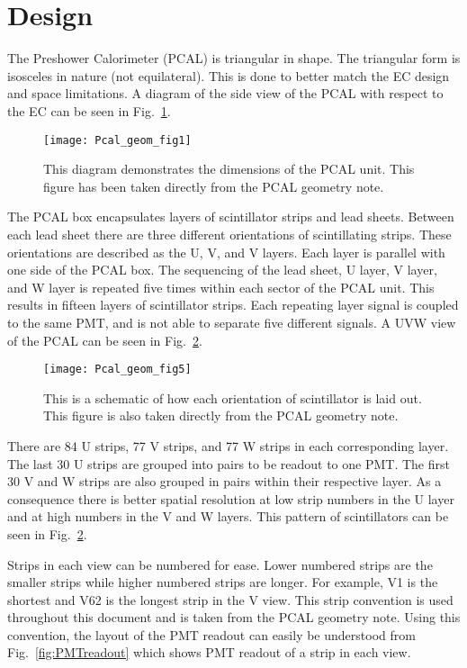 \FloatBarrier
\section{Design}
The Preshower Calorimeter (PCAL) is triangular in shape. The triangular form is isosceles in nature (not equilateral). This is done 
to better match the EC design and space limitations. A diagram of the side view of the PCAL with respect to the EC can be seen in 
Fig.~\ref{fig:geomfig1}. 

\begin{figure}[h]
    \centering
    \texttt{[image: Pcal\_geom\_fig1]}
    \caption{This diagram demonstrates the dimensions of the PCAL unit. This figure has been taken directly from the PCAL 
    geometry note\cite{bib:geomnote}.}
    \label{fig:geomfig1}
\end{figure}

The PCAL box encapsulates layers of scintillator strips and lead sheets. Between each lead sheet there are three different 
orientations of scintillating strips. These orientations are described as the U, V, and V layers. Each layer is parallel 
with one side of the PCAL box. The sequencing of the lead sheet, U layer, V layer, and W layer is repeated five times within
each sector of the PCAL unit. This results in fifteen layers of scintillator strips. Each repeating layer signal is coupled 
to the same PMT, and  is not able to separate five different signals. A UVW view of the PCAL can be seen in Fig.~\ref{fig:geomfig5}.

\begin{figure}[h]
    \centering
    \texttt{[image: Pcal\_geom\_fig5]}
    \caption{This is a schematic of how each orientation of scintillator is laid out. This figure is also taken directly from
     the PCAL geometry note\cite{bib:geomnote}.}
    \label{fig:geomfig5}
\end{figure}
\FloatBarrier

\FloatBarrier
There are 84 U strips, 77 V strips, and 77 W strips in each corresponding layer. The last 30 U strips are grouped into pairs 
to be readout to one PMT. The first 30 V and W strips are also grouped in pairs within their respective layer. As a consequence 
there is better spatial resolution at low strip numbers in the U layer and at high numbers in the V and W layers. This pattern 
of scintillators can be seen in Fig.~\ref{fig:geomfig5}.

Strips in each view can be numbered for ease. Lower numbered strips are the smaller strips while higher numbered strips are longer.
For example, V1 is the shortest and V62 is the longest strip in the V view. This strip convention is used throughout this
document and is taken from the PCAL geometry note\cite{bib:geomnote}. Using this convention, the layout of the PMT readout 
can easily be understood from Fig.~\ref{fig:PMTreadout} which shows PMT readout of a strip in each view.

